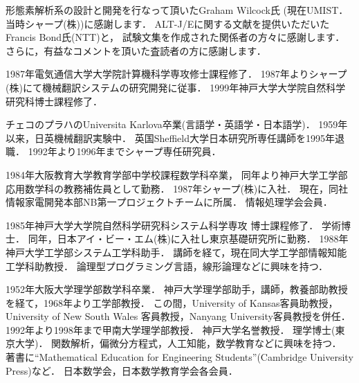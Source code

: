 \acknowledgment

形態素解析系の設計と開発を行なって頂いたGraham Wilcock氏
(現在UMIST．当時シャープ(株))に感謝します．
ALT-J/Eに関する文献を提供いただいたFrancis Bond氏(NTT)と，
試験文集を作成された関係者の方々に感謝します．
さらに，有益なコメントを頂いた査読者の方に感謝します．




\begin{biography}
{1987年電気通信大学大学院計算機科学専攻修士課程修了．
1987年よりシャープ(株)にて機械翻訳システムの研究開発に従事．
1999年神戸大学大学院自然科学研究科博士課程修了．}

{チェコのプラハのUniversita Karlova卒業(言語学・英語学・日本語学)．
1959年以来，日英機械翻訳実験中．
英国Sheffield大学日本研究所専任講師を1995年退職．
1992年より1996年までシャープ専任研究員．}

{1984年大阪教育大学教育学部中学校課程数学科卒業，
同年より神戸大学工学部応用数学科の教務補佐員として勤務．
1987年シャープ(株)に入社．
現在，同社情報家電開発本部NB第一プロジェクトチームに所属．
情報処理学会会員．}

{1985年神戸大学大学院自然科学研究科システム科学専攻
博士課程修了．
学術博士．
同年，日本アイ・ビー・エム(株)に入社し東京基礎研究所に勤務．
1988年神戸大学工学部システム工学科助手．
講師を経て，現在同大学工学部情報知能工学科助教授．
論理型プログラミング言語，線形論理などに興味を持つ．}

{1952年大阪大学理学部数学科卒業．
神戸大学理学部助手，講師，教養部助教授を経て，1968年より工学部教授．
この間，University of Kansas客員助教授，University of New South Wales
客員教授，Nanyang University客員教授を併任．
1992年より1998年まで甲南大学理学部教授．
神戸大学名誉教授．
理学博士(東京大学)．
関数解析，偏微分方程式，人工知能，数学教育などに興味を持つ．
著書に``Mathematical Education for Engineering Students''(Cambridge
University Press)など．
日本数学会，日本数学教育学会各会員．}


\end{biography}

\newpage
\appendix

